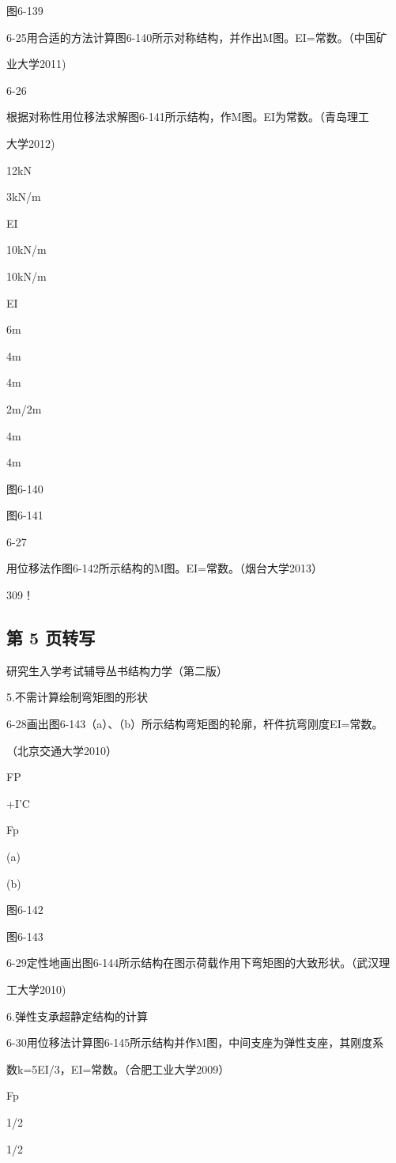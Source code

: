 图6-139

6-25用合适的方法计算图6-140所示对称结构，并作出M图。EI=常数。（中国矿

业大学2011)

6-26

根据对称性用位移法求解图6-141所示结构，作M图。EI为常数。（青岛理工

大学2012)

12kN

3kN/m

EI

10kN/m

10kN/m

EI

6m

4m

4m

2m/2m

4m

4m

图6-140

图6-141

6-27

用位移法作图6-142所示结构的M图。EI=常数。（烟台大学2013）

309！

\subsection*{第 5 页转写}
研究生入学考试辅导丛书结构力学（第二版）

5.不需计算绘制弯矩图的形状

6-28画出图6-143（a）、（b）所示结构弯矩图的轮廓，杆件抗弯刚度EI=常数。

（北京交通大学2010）

FP

+I'C

Fp

(a)

(b)

图6-142

图6-143

6-29定性地画出图6-144所示结构在图示荷载作用下弯矩图的大致形状。（武汉理

工大学2010)

6.弹性支承超静定结构的计算

6-30用位移法计算图6-145所示结构并作M图，中间支座为弹性支座，其刚度系

数k=5EI/3，EI=常数。（合肥工业大学2009）

Fp

1/2

1/2

